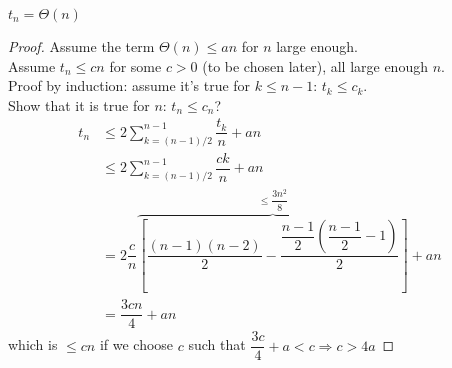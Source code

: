 \begin{theorem}
$t_n=\Theta (n)$
\end{theorem}
\begin{proof}
Assume the term $\Theta (n)\leq an$ for $n$ large enough.\\
Assume $t_n\leq cn$ for some $c>0$ (to be chosen later), all large enough $n$.\\
Proof by induction: assume it's true for $k\leq n-1$: $t_k\leq c_k$.\\
Show that it is true for $n$: $t_n\leq c_n$?
\begin{align*}
t_n &\leq 2\sum\limits_{k=(n-1)/2}^{n-1}\dfrac{t_k}{n}+an\\
&\leq 2\sum\limits_{k=(n-1)/2}^{n-1}\dfrac{ck}{n}+an\\
&=2\dfrac{c}{n}\overbrace{\left[\dfrac{(n-1)(n-2)}{2}-\dfrac{\dfrac{n-1}{2}\left(\dfrac{n-1}{2}-1\right)}{2}\right]}\limits^{\leq \dfrac{3n^2}{8}}+an\\
&=\dfrac{3cn}{4}+an
\end{align*}
which is $\leq cn$ if we choose $c$ such that $\dfrac{3c}{4}+a<c \Rightarrow c>4a$
\end{proof}